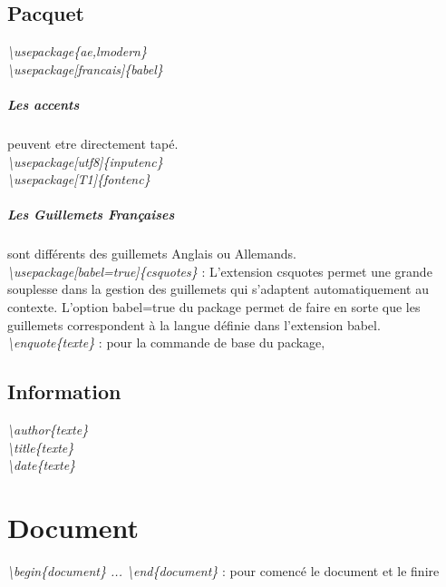 \documentclass[a4paper,12pt]{report}
\begin{document}
		\subsection{Pacquet}
			\textit{\textbackslash usepackage\{ae,lmodern\}}\\
			\textit{\textbackslash usepackage[francais]\{babel\}}
					\subparagraph{Les accents} peuvent etre directement tapé.\\
						\textit{\textbackslash usepackage[utf8]\{inputenc\}}\\
						\textit{\textbackslash usepackage[T1]\{fontenc\}}
					\subparagraph{Les Guillemets Françaises} sont différents des guillemets Anglais ou Allemands.\\
						\textit{\textbackslash usepackage[babel=true]\{csquotes\}} : L'extension csquotes permet une grande souplesse dans la gestion des guillemets qui s'adaptent automatiquement au contexte. L'option babel=true du package permet de faire en sorte que les guillemets correspondent à la langue définie dans l'extension babel.\\
						\textit{\textbackslash enquote\{texte\}} : pour la commande de base du package,
		\subsection{Information}
			\label{informations}
			\textit{\textbackslash author\{texte\}}\\
			\textit{\textbackslash title\{texte\}}\\
			\textit{\textbackslash date\{texte\}}
	\section{Document}
		\textit{\textbackslash begin\{document\} ... \textbackslash end\{document\}} : pour comencé le document et le finire
\end{document}
